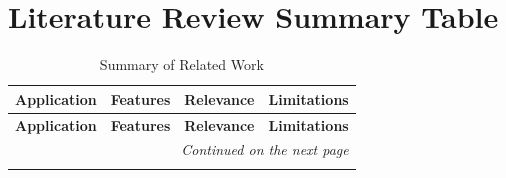 \documentclass{FastFyp}
\begin{document}
\section{Literature Review Summary Table}

\begin{longtable}{|p{2.5cm}|p{2.5cm}|p{4cm}|p{5cm}|}
\caption{Summary of Related Work} \\
\hline
\textbf{Application} & \textbf{Features} & \textbf{Relevance} & \textbf{Limitations} \\
\hline
\endfirsthead

\hline
\textbf{Application} & \textbf{Features} & \textbf{Relevance} & \textbf{Limitations} \\
\hline
\endhead

\hline
\multicolumn{4}{r}{\textit{Continued on the next page}} \\
\hline
\endfoot

\hline
\endlastfoot


\end{longtable}
\end{document}
